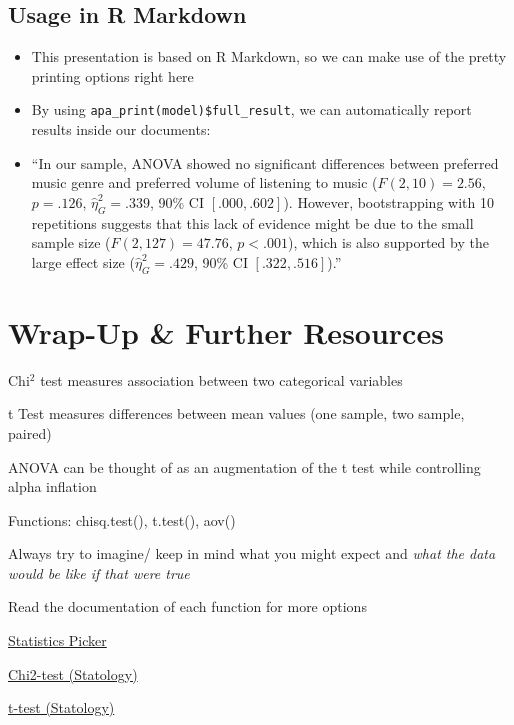 \documentclass[
]{book}
\begin{document}
\subsection{Usage in R Markdown}\label{usage-in-r-markdown}

\begin{itemize}
\item
  This presentation is based on R Markdown, so we can make use of the pretty printing options right here
\item
  By using \texttt{apa\_print(model)\$full\_result}, we can automatically report results inside our documents:
\item
  ``In our sample, ANOVA showed no significant differences between preferred music genre and preferred volume of listening to music (\(F(2, 10) = 2.56\), \(p = .126\), \(\hat{\eta}^2_G = .339\), 90\% CI \([.000, .602]\)). However, bootstrapping with 10 repetitions suggests that this lack of evidence might be due to the small sample size (\(F(2, 127) = 47.76\), \(p < .001\)), which is also supported by the large effect size (\(\hat{\eta}^2_G = .429\), 90\% CI \([.322, .516]\)).''
\end{itemize}

\section*{Wrap-Up \& Further Resources}\label{wrap-up-further-resources-6}

Chi\(^2\) test measures association between two categorical variables

t Test measures differences between mean values (one sample, two sample, paired)

ANOVA can be thought of as an augmentation of the t test while controlling alpha inflation

Functions: chisq.test(), t.test(), aov()

Always try to imagine/ keep in mind what you might expect and \emph{what the data would be like if that were true}

Read the documentation of each function for more options

\href{https://the-tave.shinyapps.io/Statistics-Picker/}{Statistics Picker}

\href{https://www.statology.org/chi-square-test-of-independence-in-r/}{Chi2-test (Statology)}

\href{https://www.statology.org/two-sample-t-test/}{t-test (Statology)}
\end{document}

